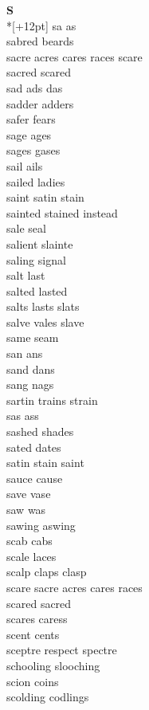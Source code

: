 \vspace{14pt}
\noindent\textbf{\Large S}\\*[+12pt]
sa as\\
sabred beards\\
sacre acres cares races scare\\
sacred scared\\
sad ads das\\
sadder adders\\
safer fears\\
sage ages\\
sages gases\\
sail ails\\
sailed ladies\\
saint satin stain\\
sainted stained instead\\
sale seal\\
salient slainte\\
saling signal\\
salt last\\
salted lasted\\
salts lasts slats\\
salve vales slave\\
same seam\\
san ans\\
sand dans\\
sang nags\\
sartin trains strain\\
sas ass\\
sashed shades\\
sated dates\\
satin stain saint\\
sauce cause\\
save vase\\
saw was\\
sawing aswing\\
scab cabs\\
scale laces\\
scalp claps clasp\\
scare sacre acres cares races\\
scared sacred\\
scares caress\\
scent cents\\
sceptre respect spectre\\
schooling slooching\\
scion coins\\
scolding codlings\\
